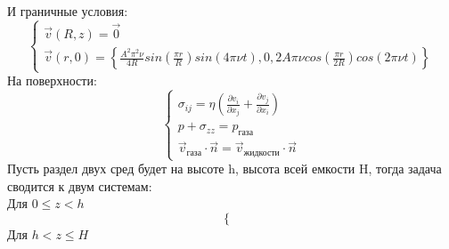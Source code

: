 И граничные условия:
\begin{equation}
    \begin{cases}
        \vec{v}\left( R, z \right) = \vec{0} \\
        \vec{v}\left( r, 0 \right) = \left\{\frac{A^2 \pi^2 \nu}{4R}sin\left( \frac{\pi r}{R} \right)sin\left( 4\pi \nu t\right), 0, 2A\pi\nu cos\left( \frac{\pi r}{2R} \right)cos\left( 2\pi \nu t\right) \right\}
    \end{cases}
\end{equation}
На поверхности:
\begin{equation}
    \begin{cases}
        \sigma_{ij} = \eta \left( \frac{\partial v_i}{\partial x_j} + \frac{\partial v_j}{\partial x_i} \right) \\
        p + \sigma_{zz} = p_{\text{газа}} \\
        \vec{v}_{\text{газа}} \cdot \vec{n} = \vec{v}_{\text{жидкости}} \cdot \vec{n}
    \end{cases}
\end{equation}
Пусть раздел двух сред будет на высоте h, высота всей емкости H, тогда задача сводится к двум системам: \\
Для $ 0 \le z < h $
\begin{equation}
    \begin{cases}
        
    \end{cases}
\end{equation}
Для $ h < z \le H $
